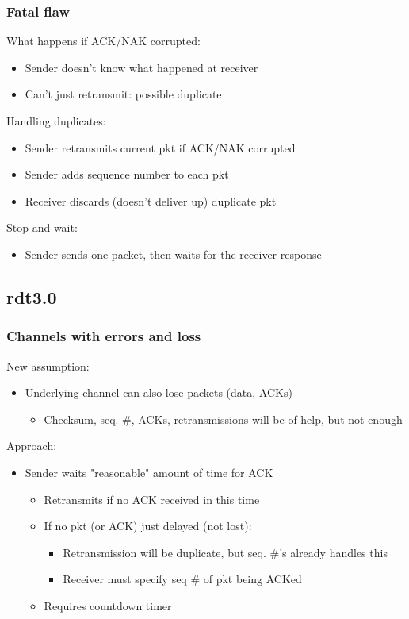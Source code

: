 \documentclass{article}[18pt]
\begin{document}
\subsubsection{Fatal flaw}
What happens if ACK/NAK corrupted:
\begin{itemize}
	\item Sender doesn't know what happened at receiver
	\item Can't just retransmit: possible duplicate
\end{itemize}
Handling duplicates:
\begin{itemize}
	\item Sender retransmits current pkt if ACK/NAK corrupted
	\item Sender adds sequence number to each pkt
	\item Receiver discards (doesn't deliver up) duplicate pkt
\end{itemize}
Stop and wait:
\begin{itemize}
	\item Sender sends one packet, then waits for the receiver response
\end{itemize}
\subsection{rdt3.0}
\subsubsection{Channels with errors and loss}
New assumption:
\begin{itemize}
	\item Underlying channel can also lose packets (data, ACKs)
	\begin{itemize}
		\item Checksum, seq. \#, ACKs, retransmissions will be of help, but not enough
	\end{itemize}
\end{itemize}
Approach:
\begin{itemize}
	\item Sender waits "reasonable" amount of time for ACK
	\begin{itemize}
		\item Retransmits if no ACK received in this time
		\item If no pkt (or ACK) just delayed (not lost):
		\begin{itemize}
			\item Retransmission will be duplicate, but seq. \#'s already handles this
			\item Receiver must specify seq \# of pkt being ACKed
		\end{itemize}
		\item Requires countdown timer
	\end{itemize}
\end{itemize}
\end{document}

